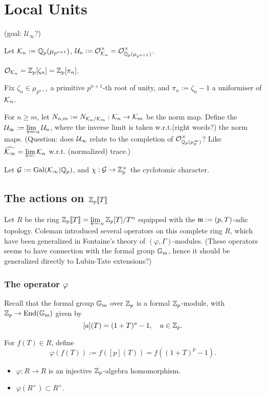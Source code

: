 \section{Local Units}

(goal: $\mathcal{U}_\infty$?)

Let $\mathcal{K}_n := \mathbb{Q}_p(\mu_{p^{n+1}})$,
$\mathcal{U}_n := \mathcal{O}_{\mathcal{K}_n}^\times = \mathcal{O}_{\mathbb{Q}_p(\mu_{p^{n+1}})}^\times$.

$\mathcal{O}_{\mathcal{K}_n}=\mathbb{Z}_p[\zeta_n] = \mathbb{Z}_p[\pi_n]$.

Fix $\zeta_n\in\mu_{p^{n+1}}$ a primitive $p^{n+1}$-th root of unity,
and $\pi_n := \zeta_n - 1$ a uniformiser of $\mathcal{K}_n$.

For $n\ge m$, let $N_{n, m} := N_{\mathcal{K}_n/\mathcal{K}_m} : \mathcal{K}_n\to\mathcal{K}_m$
be the norm map.
Define the $\mathcal{U}_\infty := \varprojlim_{n} \mathcal{U}_n$,
where the inverse limit is taken w.r.t.(right words?) the norm maps.
(Question: does $\mathcal{U}_\infty$ relate to the completion of $\mathcal{O}^\times_{\mathbb{Q}_p(\mu_p^\infty)}$? Like $\widehat{\mathcal{K}_\infty} = \varprojlim \mathcal{K}_n$ w.r.t.\! (normalized) trace.)

Let $\mathcal{G} := \operatorname{Gal}(\mathcal{K}_\infty|\mathbb{Q}_p)$,
and $\chi : \mathcal{G}\to \mathbb{Z}_p^\times$ the cyclotomic character.

\subsection{The actions on \texorpdfstring{$\mathbb{Z}_p\llbracket T \rrbracket$}{Zp[[T]]}}
Let $R$ be the ring $\mathbb{Z}_p\llbracket T \rrbracket = \varprojlim_{n} \mathbb{Z}_p[T]/T^n$ equipped with the $\mathfrak{m} := (p, T)$-adic topology.
Coleman introduced several operators on this complete ring $R$,
which have been generalized in Fontaine's theory of $(\varphi, \Gamma)$-modules.
(These operators seems to have connection with the formal group ${\mathbb{G}_{\mathrm{m}}}$, hence it should be generalized directly to Lubin-Tate extensions?)
\subsubsection{The operator \texorpdfstring{$\varphi$}{phi}}


Recall that the formal group ${\mathbb{G}_{\mathrm{m}}}$ over $\mathbb{Z}_p$ is a formal $\mathbb{Z}_p$-module,
with $\mathbb{Z}_p\to\operatorname{End}({\mathbb{G}_{\mathrm{m}}})$ given by
\[[a](T) = (1 + T)^a - 1,\quad a\in\mathbb{Z}_p.\]

For $f(T)\in R$, define \[\varphi(f(T)) := f([p](T)) = f((1 + T)^p - 1).\]
\begin{itemize}
\item $\varphi : R\to R$ is an injective $\mathbb{Z}_p$-algebra homomorphism.
\item $\varphi(R^\times)\subset R^\times$.
\end{itemize}

